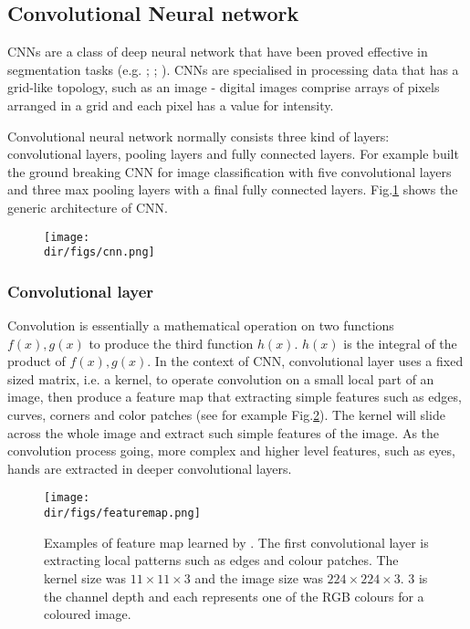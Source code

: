 \subsection{Convolutional Neural network}
CNNs \citet{lecun2015deep} are a class of deep neural network that have been proved effective in segmentation tasks (e.g. \citet{long2015fully}; \citet{krizhevsky2012imagenet}; \citet{girshick2014rich}). CNNs are specialised in processing data that has a grid-like topology, such as an image - digital images comprise arrays of pixels arranged in a grid and each pixel has a value for intensity. 

Convolutional neural network normally consists three kind of layers: convolutional layers, pooling layers and fully connected layers. For example \citet{krizhevsky2012imagenet} built the ground breaking CNN for image classification with five convolutional layers and three max pooling layers with a final fully connected layers. Fig.\ref{cnn} shows the generic architecture of CNN. 

\begin{figure}[htbp]
  \centering
  \texttt{[image: \\dir/figs/cnn.png]}
  \caption{\citet{bernal2019deep}}
  \label{cnn}
\end{figure}

\subsubsection{Convolutional layer}
Convolution is essentially a mathematical operation on two functions $f(x),g(x)$ to produce the third function $h(x)$. $h(x)$ is the integral of the product of $f(x),g(x)$. In the context of CNN, convolutional layer uses a fixed sized matrix, i.e. a kernel, to operate convolution on a small local part of an image, then produce a feature map that extracting simple features such as edges, curves, corners and color patches (see for example Fig.\ref{featuremap}). The kernel will slide across the whole image and extract such simple features of the image. As the convolution process going, more complex and higher level features, such as eyes, hands are extracted in deeper convolutional layers.

\begin{figure}[htbp]
  \centering
  \texttt{[image: \\dir/figs/featuremap.png]}
  \caption{Examples of feature map learned by \citet{krizhevsky2012imagenet}. The first convolutional layer is extracting local patterns such as edges and colour patches. The kernel size was $11\times11\times3$ and the image size was $224\times224\times3$. 3 is the channel depth and each represents one of the RGB colours for a coloured image.}
  \label{featuremap}
\end{figure}

